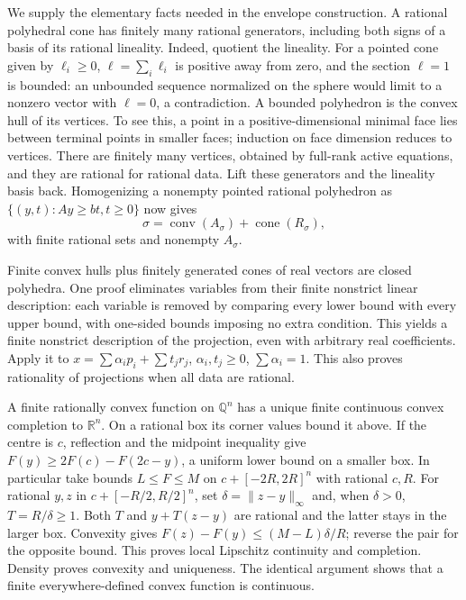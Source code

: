 \documentclass[
  11pt,
]{article}
\begin{document}
We supply the elementary facts needed in the envelope construction. A
rational polyhedral cone has finitely many rational generators,
including both signs of a basis of its rational lineality. Indeed,
quotient the lineality. For a pointed cone given by \(\ell_i\geq0\),
\(\ell=\sum_i\ell_i\) is positive away from zero, and the section
\(\ell=1\) is bounded: an unbounded sequence normalized on the sphere
would limit to a nonzero vector with \(\ell=0\), a contradiction. A
bounded polyhedron is the convex hull of its vertices. To see this, a
point in a positive-dimensional minimal face lies between terminal
points in smaller faces; induction on face dimension reduces to
vertices. There are finitely many vertices, obtained by full-rank active
equations, and they are rational for rational data. Lift these
generators and the lineality basis back. Homogenizing a nonempty pointed
rational polyhedron as \(\{(y,t):Ay\geq bt,t\geq0\}\) now gives
\[\sigma=\operatorname{conv}(A_\sigma)+\operatorname{cone}(R_\sigma), \tag{7}\]
with finite rational sets and nonempty \(A_\sigma\).

Finite convex hulls plus finitely generated cones of real vectors are
closed polyhedra. One proof eliminates variables from their finite
nonstrict linear description: each variable is removed by comparing
every lower bound with every upper bound, with one-sided bounds imposing
no extra condition. This yields a finite nonstrict description of the
projection, even with arbitrary real coefficients. Apply it to
\(x=\sum\alpha_ip_i+\sum t_jr_j\), \(\alpha_i,t_j\geq0\),
\(\sum\alpha_i=1\). This also proves rationality of projections when all
data are rational.

A finite rationally convex function on \(\mathbb Q^n\) has a unique
finite continuous convex completion to \(\mathbb R^n\). On a rational
box its corner values bound it above. If the centre is \(c\), reflection
and the midpoint inequality give \(F(y)\geq2F(c)-F(2c-y)\), a uniform
lower bound on a smaller box. In particular take bounds
\(L\leq F\leq M\) on \(c+[-2R,2R]^n\) with rational \(c,R\). For
rational \(y,z\) in \(c+[-R/2,R/2]^n\), set \(\delta=\|z-y\|_\infty\)
and, when \(\delta>0\), \(T=R/\delta\geq1\). Both \(T\) and \(y+T(z-y)\)
are rational and the latter stays in the larger box. Convexity gives
\(F(z)-F(y)\leq(M-L)\delta/R\); reverse the pair for the opposite bound.
This proves local Lipschitz continuity and completion. Density proves
convexity and uniqueness. The identical argument shows that a finite
everywhere-defined convex function is continuous.
\end{document}
